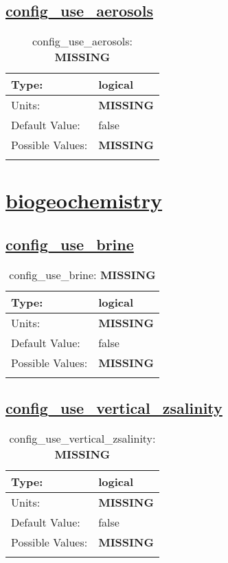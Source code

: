 \subsection[config\_use\_aerosols]{\hyperref[sec:nm_tab_column_tracers]{config\_use\_aerosols}}
\label{subsec:nm_sec_config_use_aerosols}
\begin{center}
\begin{longtable}{| p{2.0in} || p{4.0in} |}
    \hline
    Type: & logical \\
    \hline
    Units: & {\bf \color{red} MISSING} \\
    \hline
    Default Value: & false \\
    \hline
    Possible Values: & {\bf \color{red} MISSING} \\
    \hline
    \caption{config\_use\_aerosols: {\bf \color{red} MISSING}}
\end{longtable}
\end{center}
\section[biogeochemistry]{\hyperref[sec:nm_tab_biogeochemistry]{biogeochemistry}}
\label{sec:nm_sec_biogeochemistry}
\subsection[config\_use\_brine]{\hyperref[sec:nm_tab_biogeochemistry]{config\_use\_brine}}
\label{subsec:nm_sec_config_use_brine}
\begin{center}
\begin{longtable}{| p{2.0in} || p{4.0in} |}
    \hline
    Type: & logical \\
    \hline
    Units: & {\bf \color{red} MISSING} \\
    \hline
    Default Value: & false \\
    \hline
    Possible Values: & {\bf \color{red} MISSING} \\
    \hline
    \caption{config\_use\_brine: {\bf \color{red} MISSING}}
\end{longtable}
\end{center}
\subsection[config\_use\_vertical\_zsalinity]{\hyperref[sec:nm_tab_biogeochemistry]{config\_use\_vertical\_zsalinity}}
\label{subsec:nm_sec_config_use_vertical_zsalinity}
\begin{center}
\begin{longtable}{| p{2.0in} || p{4.0in} |}
    \hline
    Type: & logical \\
    \hline
    Units: & {\bf \color{red} MISSING} \\
    \hline
    Default Value: & false \\
    \hline
    Possible Values: & {\bf \color{red} MISSING} \\
    \hline
    \caption{config\_use\_vertical\_zsalinity: {\bf \color{red} MISSING}}
\end{longtable}
\end{center}
